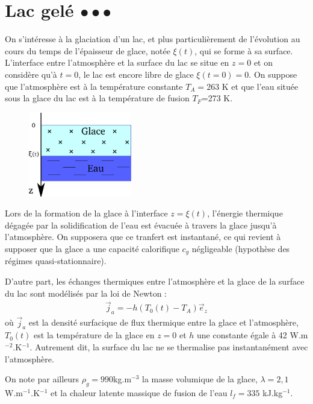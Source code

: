 \documentclass{report}
\begin{document}
\newpage

\section*{Lac gelé $\bullet\bullet\bullet$}

On s'intéresse à la glaciation d'un lac, et plus particulièrement de l'évolution au cours du temps de l'épaisseur de glace, notée $\xi(t)$, qui se forme à sa surface. L'interface entre l'atmosphère et la surface du lac se situe en $z=0$ et on considère qu'à $t=0$, le lac est encore libre de glace $\xi(t=0)=0$. On suppose que l'atmosphère est à la température constante $T_A=263$ K et que l'eau située sous la glace du lac est à la température de fusion $T_F$=273 K. 

\begin{figure}[h!]
\centering
  \includegraphics[width=0.4\textwidth]{diffusion_glace.pdf}
\end{figure}

Lors de la formation de la glace à l'interface $z=\xi(t)$, l'énergie thermique dégagée par la solidification de l'eau est évacuée à travers la glace jusqu'à l'atmosphère. On supposera que ce tranfert est instantané, ce qui revient à supposer que la glace a une capacité calorifique $c_g$ négligeable (hypothèse des régimes quasi-stationnaire).

D'autre part, les échanges thermiques entre l'atmosphère et la glace de la surface du lac sont modélisés par la loi de Newton : 
\begin{align*}
	\vec{j}_a=-h(T_0(t)-T_A)\vec{e}_z
\end{align*}
où $\vec{j}_a$ est la densité surfacique de flux thermique entre la glace et l'atmosphère, $T_0(t)$ est la température de la glace en $z=0$ et $h$ une constante égale à 42 W.m$^{-2}$.K$^{-1}$. Autrement dit, la surface du lac ne se thermalise pas instantanément avec l'atmosphère. 

On note par ailleurs $\rho_g=990$kg.m$^{-3}$ la masse volumique de la glace, $\lambda=2,1$ W.m$^{-1}$.K$^{-1}$ et la chaleur latente massique de fusion de l'eau $l_f=335$ kJ.kg$^{-1}$.
\end{document}
